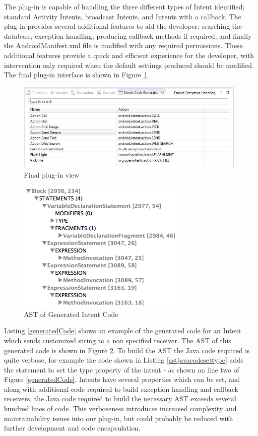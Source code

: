 The plug-in is capable of handling the three different types of Intent identified; standard Activity Intents, broadcast Intents, and Intents with a callback. The plug-in provides several additional features to aid the developer: searching the database, exception handling, producing callback methods if required, and finally the AndroidManifest.xml file is modified with any required permissions. These additional features provide a quick and efficient experience for the developer, with intervention only required when the default settings produced should be modified. The final plug-in interface is shown in Figure \ref{codegeneratorview}.

\begin{figure}[t]
  \centering
    \includegraphics[width=\textwidth]{codegenerator}
  \caption{Final plug-in view}
\label{codegeneratorview}
\end{figure}

\begin{figure}[t]
  \centering
    \includegraphics[width=.45\textwidth]{ast}
  \caption{AST of Generated Intent Code}
\label{intenttreeview}
\end{figure}

Listing \ref{generatedCode} shows an example of the generated code for an Intent which sends customized string to a non specified receiver. The AST of this generated code is shown in Figure \ref{intenttreeview}. To build the AST the Java code required is quite verbose, for example the code shown in Listing \ref{astjavacodesettype} adds the statement to set the type property of the intent - as shown on line two of Figure \ref{generatedCode}. Intents have several properties which can be set, and along with additional code required to build exception handling and callback receivers, the Java code required to build the necessary AST exceeds several hundred lines of code. This verboseness introduces increased complexity and maintainability issues into our plug-in, but could probably be reduced with further development and code encapsulation.

